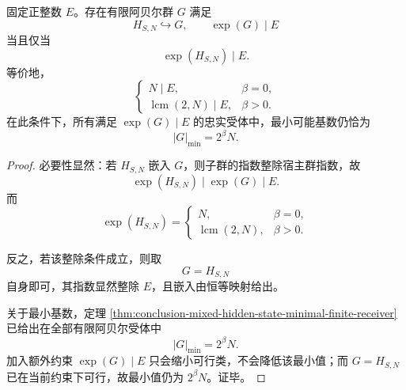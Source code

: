 \begin{theorem}[带指数上界的忠实受体存在性与极小规模]\label{thm:conclusion-mixed-hiddenstate-exponent-constrained-receiver}
固定正整数 \(E\)。存在有限阿贝尔群 \(G\) 满足
\[
H_{S,N}\hookrightarrow G,
\qquad
\exp(G)\mid E
\]
当且仅当
\[
\exp(H_{S,N})\mid E.
\]
等价地，
\[
\begin{cases}
N\mid E,& \beta=0,\\[1mm]
\operatorname{lcm}(2,N)\mid E,& \beta>0.
\end{cases}
\]
在此条件下，所有满足 \(\exp(G)\mid E\) 的忠实受体中，最小可能基数仍恰为
\[
|G|_{\min}=2^\beta N.
\]
\end{theorem}
\begin{proof}
必要性显然：若 \(H_{S,N}\) 嵌入 \(G\)，则子群的指数整除宿主群指数，故
\[
\exp(H_{S,N})\mid \exp(G)\mid E.
\]
而
\[
\exp(H_{S,N})=
\begin{cases}
N,& \beta=0,\\[1mm]
\operatorname{lcm}(2,N),& \beta>0.
\end{cases}
\]

反之，若该整除条件成立，则取
\[
G=H_{S,N}
\]
自身即可，其指数显然整除 \(E\)，且嵌入由恒等映射给出。

关于最小基数，定理 \ref{thm:conclusion-mixed-hidden-state-minimal-finite-receiver} 已给出在全部有限阿贝尔受体中
\[
|G|_{\min}=2^\beta N.
\]
加入额外约束 \(\exp(G)\mid E\) 只会缩小可行类，不会降低该最小值；而 \(G=H_{S,N}\) 已在当前约束下可行，故最小值仍为 \(2^\beta N\)。证毕。
\end{proof}

